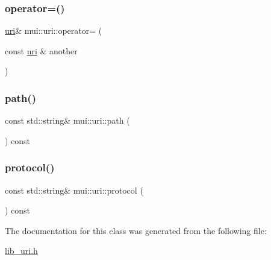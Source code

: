 \mbox{\label{classmui_1_1uri_ad5365bd3b8040dc57eb9ad25930a46f6}} 
\subsubsection{\texorpdfstring{operator=()}{operator=()}}
{\footnotesize\ttfamily \hyperlink{classmui_1_1uri}{uri}\& mui\+::uri\+::operator= (\begin{DoxyParamCaption}\item[{const \hyperlink{classmui_1_1uri}{uri} \&}]{another }\end{DoxyParamCaption})\hspace{0.3cm}{\ttfamily [delete]}}

\mbox{\label{classmui_1_1uri_ab0525a812499d99a408c4706aac874ed}} 
\subsubsection{\texorpdfstring{path()}{path()}}
{\footnotesize\ttfamily const std\+::string\& mui\+::uri\+::path (\begin{DoxyParamCaption}{ }\end{DoxyParamCaption}) const\hspace{0.3cm}{\ttfamily [inline]}}

\mbox{\label{classmui_1_1uri_a8f1e0f3bc7b709c25e39d90e9df8ae62}} 
\subsubsection{\texorpdfstring{protocol()}{protocol()}}
{\footnotesize\ttfamily const std\+::string\& mui\+::uri\+::protocol (\begin{DoxyParamCaption}{ }\end{DoxyParamCaption}) const\hspace{0.3cm}{\ttfamily [inline]}}



The documentation for this class was generated from the following file\+:\begin{DoxyCompactItemize}
\item 
\hyperlink{lib__uri_8h}{lib\+\_\+uri.\+h}\end{DoxyCompactItemize}
